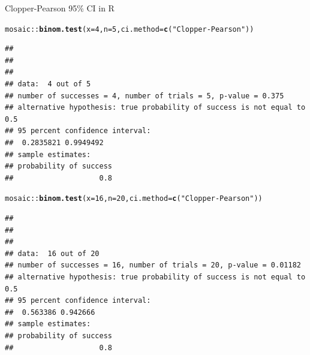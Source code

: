 \documentclass{beamer}\usepackage[]{graphicx}\usepackage[]{color}
\newcommand{\hlnum}[1]{\textcolor[rgb]{0.686,0.059,0.569}{#1}}%
\newcommand{\hlstr}[1]{\textcolor[rgb]{0.192,0.494,0.8}{#1}}%
\newcommand{\hlcom}[1]{\textcolor[rgb]{0.678,0.584,0.686}{\textit{#1}}}%
\newcommand{\hlopt}[1]{\textcolor[rgb]{0,0,0}{#1}}%
\newcommand{\hlstd}[1]{\textcolor[rgb]{0.345,0.345,0.345}{#1}}%
\newcommand{\hlkwc}[1]{\textcolor[rgb]{0.333,0.667,0.333}{#1}}%
\newcommand{\hlkwd}[1]{\textcolor[rgb]{0.737,0.353,0.396}{\textbf{#1}}}%
\newenvironment{knitrout}{}{} %
\begin{document}


\begin{frame}[fragile]{Clopper-Pearson 95\% CI in R}
\begin{knitrout}\scriptsize
{}\color{fgcolor}
\begin{alltt}
\hlstd{mosaic}\hlopt{::}\hlkwd{binom.test}\hlstd{(}\hlkwc{x}\hlstd{=}\hlnum{4}\hlstd{,} \hlkwc{n}\hlstd{=}\hlnum{5}\hlstd{,} \hlkwc{ci.method}\hlstd{=}\hlkwd{c}\hlstd{(}\hlstr{"Clopper-Pearson"}\hlstd{))}
\end{alltt}
\begin{verbatim}
## 
## 
## 
## data:  4 out of 5
## number of successes = 4, number of trials = 5, p-value = 0.375
## alternative hypothesis: true probability of success is not equal to 0.5
## 95 percent confidence interval:
##  0.2835821 0.9949492
## sample estimates:
## probability of success 
##                    0.8
\end{verbatim}
\begin{alltt}
\hlstd{mosaic}\hlopt{::}\hlkwd{binom.test}\hlstd{(}\hlkwc{x}\hlstd{=}\hlnum{16}\hlstd{,} \hlkwc{n}\hlstd{=}\hlnum{20}\hlstd{,} \hlkwc{ci.method}\hlstd{=}\hlkwd{c}\hlstd{(}\hlstr{"Clopper-Pearson"}\hlstd{))}
\end{alltt}
\begin{verbatim}
## 
## 
## 
## data:  16 out of 20
## number of successes = 16, number of trials = 20, p-value = 0.01182
## alternative hypothesis: true probability of success is not equal to 0.5
## 95 percent confidence interval:
##  0.563386 0.942666
## sample estimates:
## probability of success 
##                    0.8
\end{verbatim}

\end{knitrout}
\end{frame}
\end{document}
